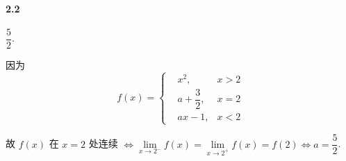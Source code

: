 \paragraph*{2.2} $\dfrac{5}{2}$.

因为 
\[
	f(x)=\left\{
\begin{aligned}
&x^2,&x>2\\
&a+\dfrac{3}{2},&x=2\\
&ax-1,&x<2
\end{aligned}
	\right.
\]

故 $f(x)$ 在 $x=2$ 处连续 $\Leftrightarrow\lim\limits_{x\to 2^{-}}f(x)=\lim\limits_{x\to 2^{+}}f(x)=f(2)\Leftrightarrow a=\dfrac{5}{2}$.   